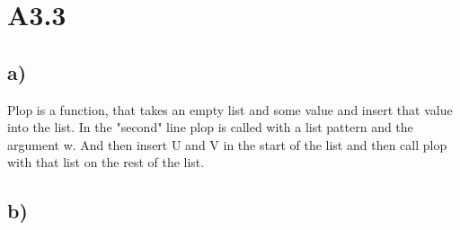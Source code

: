 \section{A3.3}
\subsection{a)}
Plop is a function, that takes an empty list and some value and insert that value into the list.
In the "second" line plop is called with a list pattern and the argument w. And then insert U and V in the start of the list and then
call plop with that list on the rest of the list.
\subsection{b)}
